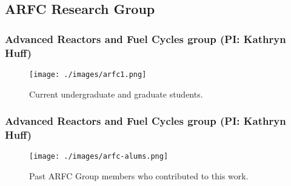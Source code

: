 \subsection{ARFC Research Group}
\begin{frame}
  \frametitle{Advanced Reactors and Fuel Cycles group (PI: Kathryn Huff)}
               \begin{figure}[t]
                \vspace*{-0.1in}
                \texttt{[image: ./images/arfc1.png]}
                       \caption{Current undergraduate and graduate students.}
               \end{figure}            
\end{frame}
\begin{frame}
  \frametitle{Advanced Reactors and Fuel Cycles group (PI: Kathryn Huff)}
               \begin{figure}[t]
                \vspace*{-0.1in}
                \texttt{[image: ./images/arfc-alums.png]}
                       \caption{Past ARFC Group members who contributed to this work.}
               \end{figure}            
\end{frame}

